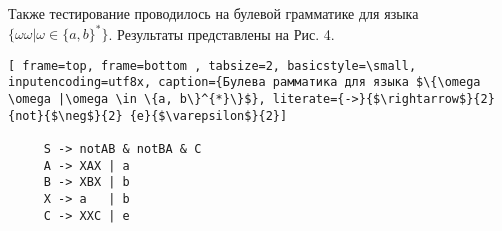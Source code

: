 Также тестирование проводилось на булевой грамматике для языка  $\{\omega \omega |\omega \in \{a, b\}^{*}\}$. Результаты представлены на Рис. 4. 

\begin{lstlisting}[ frame=top, frame=bottom , tabsize=2, basicstyle=\small, inputencoding=utf8x, caption={Булева рамматика для языка $\{\omega \omega |\omega \in \{a, b\}^{*}\}$}, literate={->}{$\rightarrow$}{2} {not}{$\neg$}{2} {e}{$\varepsilon$}{2}]

     S -> notAB & notBA & C 
     A -> XAX | a 
     B -> XBX | b  
     X -> a   | b
     C -> XXC | e  
       
\end{lstlisting}


